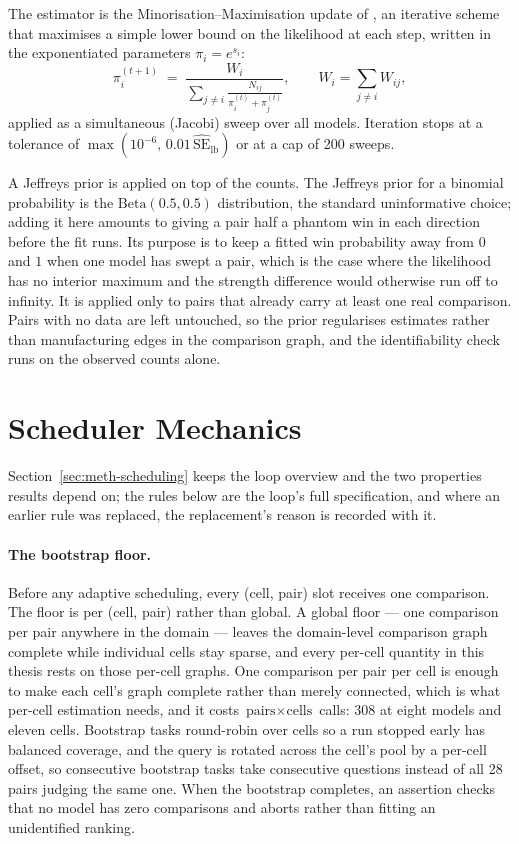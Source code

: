 The estimator is the Minorisation--Maximisation update of
\textcite{hunter2004mm}, an iterative scheme that maximises a simple
lower bound on the likelihood at each step, written in the
exponentiated parameters $\pi_i = e^{s_i}$:
\[
\pi_i^{(t+1)} \;=\;
\frac{W_i}{\displaystyle\sum_{j \neq i}
\frac{N_{ij}}{\pi_i^{(t)} + \pi_j^{(t)}}},
\qquad W_i = \sum_{j \neq i} W_{ij},
\]
applied as a simultaneous (Jacobi) sweep over all models. Iteration
stops at a tolerance of
$\max(10^{-6},\, 0.01\,\widehat{\mathrm{SE}}_{\text{lb}})$ or at a cap
of 200 sweeps.

A Jeffreys prior is applied on top of the counts. The Jeffreys prior
for a binomial probability is the $\mathrm{Beta}(0.5, 0.5)$
distribution, the standard uninformative choice; adding it here amounts
to giving a pair half a phantom win in each direction before the fit
runs. Its purpose is to keep a fitted win probability away from $0$ and
$1$ when one model has swept a pair, which is the case where the
likelihood has no interior maximum and the strength difference would
otherwise run off to infinity.
It is applied only to pairs that already carry at least one real
comparison. Pairs with no data are left untouched, so the prior
regularises estimates rather than manufacturing edges in the comparison
graph, and the identifiability check runs on the observed counts alone.

\section{Scheduler Mechanics}\label{sec:app-scheduler}

Section~\ref{sec:meth-scheduling} keeps the loop overview and the two
properties results depend on; the rules below are the loop's full
specification, and where an earlier rule was replaced, the
replacement's reason is recorded with it.

\paragraph{The bootstrap floor.}
Before any adaptive scheduling, every (cell, pair) slot receives one
comparison. The floor is per (cell, pair) rather than global. A global
floor --- one comparison per pair anywhere in the domain --- leaves the
domain-level comparison graph complete while individual cells stay
sparse, and every per-cell quantity in this thesis rests on those
per-cell graphs. One comparison per pair per cell is enough to make
each cell's graph complete rather than merely connected, which is what
per-cell estimation needs, and it costs $\text{pairs} \times
\text{cells}$ calls: 308 at eight models and eleven cells. Bootstrap
tasks round-robin over cells so a run stopped early has balanced
coverage, and the query is rotated across the cell's pool by a
per-cell offset, so consecutive bootstrap tasks take consecutive
questions instead of all 28 pairs judging the same one. When the
bootstrap completes, an assertion checks that no model has zero
comparisons and aborts rather than fitting an unidentified ranking.

